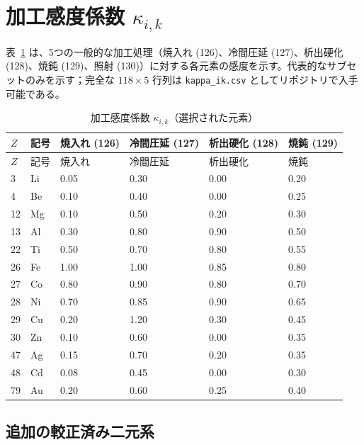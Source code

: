 \documentclass[12pt,a4paper]{article}
\begin{document}
	\section{加工感度係数 $\kappa_{i,k}$}
	表~\ref{tab:kappa_ik} は、5つの一般的な加工処理（焼入れ (126)、冷間圧延 (127)、析出硬化 (128)、焼鈍 (129)、照射 (130)）に対する各元素の感度を示す。代表的なサブセットのみを示す；完全な $118\times5$ 行列は \texttt{kappa\_ik.csv} としてリポジトリで入手可能である。
	
	\begin{longtable}{p{1.8cm} p{1.2cm} p{1.2cm} p{1.2cm} p{1.2cm} p{1.2cm}}
		\caption{加工感度係数 $\kappa_{i,k}$（選択された元素）}\label{tab:kappa_ik}\\
		\toprule
		$Z$ & 記号 & 焼入れ (126) & 冷間圧延 (127) & 析出硬化 (128) & 焼鈍 (129) \\
		\midrule
		\endfirsthead
		\toprule
		$Z$ & 記号 & 焼入れ & 冷間圧延 & 析出硬化 & 焼鈍 \\
		\midrule
		\endhead
		3  & Li  & 0.05 & 0.30 & 0.00 & 0.20 \\
		4  & Be  & 0.10 & 0.40 & 0.00 & 0.25 \\
		12 & Mg  & 0.10 & 0.50 & 0.20 & 0.30 \\
		13 & Al  & 0.30 & 0.80 & 0.90 & 0.50 \\
		22 & Ti  & 0.50 & 0.70 & 0.80 & 0.55 \\
		26 & Fe  & 1.00 & 1.00 & 0.85 & 0.80 \\
		27 & Co  & 0.80 & 0.90 & 0.80 & 0.70 \\
		28 & Ni  & 0.70 & 0.85 & 0.90 & 0.65 \\
		29 & Cu  & 0.20 & 1.20 & 0.30 & 0.45 \\
		30 & Zn  & 0.10 & 0.60 & 0.00 & 0.35 \\
		47 & Ag  & 0.15 & 0.70 & 0.20 & 0.35 \\
		48 & Cd  & 0.08 & 0.45 & 0.00 & 0.30 \\
		79 & Au  & 0.20 & 0.60 & 0.25 & 0.40 \\
		\bottomrule
	\end{longtable}
	
	
	\subsection*{追加の較正済み二元系}
	
\end{document}
